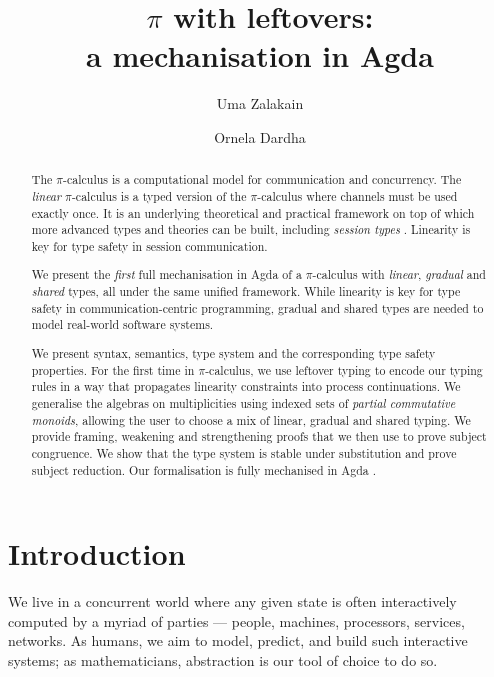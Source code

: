 \documentclass[a4paper,UKenglish,cleveref,autoref,thm-restate,authorcolumns]{lipics-v2019}
\title{$\pi$ with leftovers: \\ a mechanisation in Agda}
\author{Uma Zalakain}{University of Glasgow, Scotland}
       {u.zalakain.1@research.gla.ac.uk}{https://orcid.org/0000-0002-3268-9338}{}
\author{Ornela Dardha}{University of Glasgow, Scotland}
       {ornela.dardha@glasgow.ac.uk}{https://orcid.org/0000-0001-9927-7875}{}
\theoremstyle{definition}
\newcommand{\picalc}{$\pi$-calculus}
\begin{document}
\maketitle

\begin{abstract}
  The \picalc{} is a computational model for communication and concurrency.
  The \emph{linear} \picalc{} is a typed version of the \picalc{} where channels must be used exactly once.
  It is an underlying theoretical and practical framework on top of which more advanced types and theories can be built, including \emph{session types} \cite{H93,THK94,HVK98}.
  Linearity is key for type safety in session communication.

  We present the \emph{first} full mechanisation in Agda of a \picalc{} with \emph{linear}, \emph{gradual} and \emph{shared} types, all under the same unified framework.
  While linearity is key for type safety in communication-centric programming, gradual and shared types are needed to model real-world software systems.
  
  We present syntax, semantics, type system and the corresponding type safety properties.
  For the first time in \picalc{}, we use leftover typing \cite{Allais2018a} to encode our typing rules in a way that propagates linearity constraints into process continuations.
  We generalise the algebras on multiplicities using indexed sets of \emph{partial commutative monoids}, allowing the user to choose a mix of linear, gradual and shared typing.
  We provide framing, weakening and strengthening proofs that we then use to prove subject congruence.
  We show that the type system is stable under substitution and prove subject reduction.
%
  Our formalisation is fully mechanised in Agda \cite{Zalakain2020Agda}.
\end{abstract}


\section{Introduction}
We live in a concurrent world where any given state is often interactively computed by a myriad of parties --- people, machines, processors, services, networks.
As humans, we aim to model, predict, and build such interactive systems; as mathematicians, abstraction is our tool of choice to do so.
\end{document}
